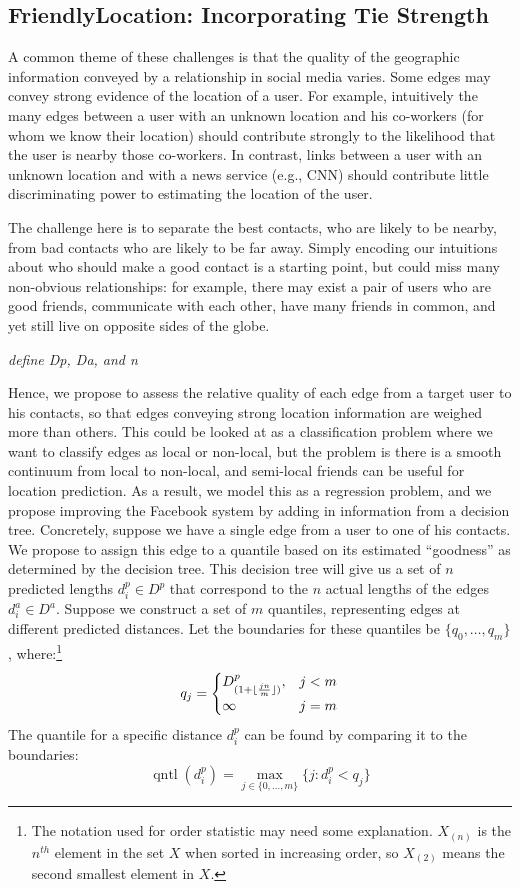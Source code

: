\documentclass{sig-alternate}
\DeclareMathOperator{\quantile}{qntl}
\newcommand{\jam}[1]{\emph{#1}}
\begin{document}
\subsection{FriendlyLocation: Incorporating Tie Strength}
A common theme of these challenges is that the quality of the geographic
information conveyed by a relationship in social media varies.
%
Some edges may convey strong evidence of the location of a user.
%
For example, intuitively the many edges between a user with an unknown location
and his co-workers (for whom we know their location) should contribute strongly
to the likelihood that the user is nearby those co-workers.
%
In contrast, links between a user with an unknown location and with a news
service (e.g., CNN) should contribute little discriminating power to estimating
the location of the user.

The challenge here is to separate the best contacts, who are likely to be
nearby, from bad contacts who are likely to be far away.
%
Simply encoding our intuitions about who should make a good contact is a
starting point, but could miss many non-obvious relationships: for example,
there may exist a pair of users who are good friends, communicate with each
other, have many friends in common, and yet still live on opposite sides of the
globe.
%

\jam{define Dp, Da, and n}

Hence, we propose to assess the relative quality of each edge from a target
user to his contacts, so that edges conveying strong location information are
weighed more than others.
%
This could be looked at as a classification problem where we want to classify
edges as local or non-local, but the problem is there is a smooth continuum
from local to non-local, and semi-local friends can be useful for location
prediction.
%
As a result, we model this as a regression problem, and we propose improving
the Facebook system by adding in information from a decision tree.
%
Concretely, suppose we have a single edge from a user to one of his contacts.
We propose to assign this edge to a quantile based on its estimated
``goodness'' as determined by the decision tree.
%
This decision tree will give us a set of $n$ predicted lengths $d^p_i \in D^p$
that correspond to the $n$ actual lengths of the edges $d^a_i \in D^a$.
%
Suppose we construct a set of $m$ quantiles, representing edges at different
predicted distances.
%
Let the boundaries for these quantiles be $\{q_0,\dots,q_m\}$,
where:\footnote{The notation used for order statistic may need some
    explanation.  $X_{(n)}$ is the $n^{th}$ element in the set $X$ when sorted
    in increasing order, so $X_{(2)}$ means the second smallest element in
$X$.}
\[
    q_j =
    \begin{cases}
        D^p_{(1+\lfloor {jn\over m} \rfloor)}, & j<m \\
        \infty & j=m
    \end{cases}
\]
\noindent The quantile for a specific distance $d^p_i$ can be found by
comparing it to the boundaries:
\[
    \quantile(d^p_i) = \max_{j \in \{0,\dots,m\}} \{j: d^p_i<q_j\}
\]
\end{document}
